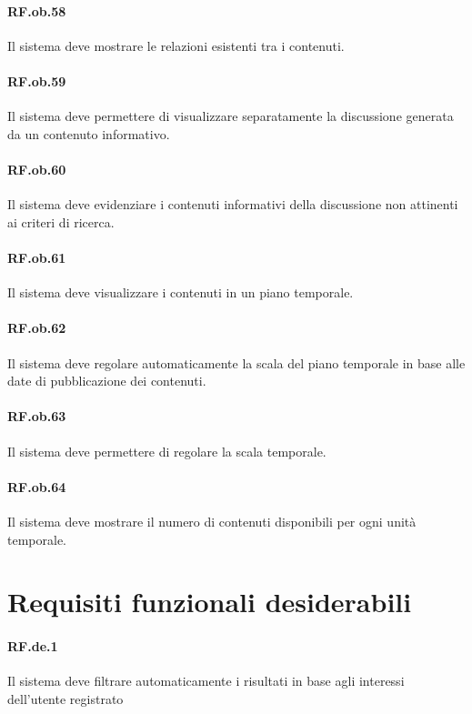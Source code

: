\documentclass[10pt,a4paper,headinclude,footinclude,hidelinks]{scrreprt} %
\begin{document}
	\paragraph{RF.ob.58} Il sistema deve mostrare le relazioni esistenti tra i contenuti.

	\paragraph{RF.ob.59} Il sistema deve permettere di visualizzare separatamente la discussione generata da un contenuto informativo.

	\paragraph{RF.ob.60} Il sistema deve evidenziare i contenuti informativi della discussione non attinenti ai criteri di ricerca.

	\paragraph{RF.ob.61} Il sistema deve visualizzare i contenuti in un piano temporale.

	\paragraph{RF.ob.62} Il sistema deve regolare automaticamente la scala del piano temporale in base alle date di pubblicazione dei contenuti.

	\paragraph{RF.ob.63} Il sistema deve permettere di regolare la scala temporale.

	\paragraph{RF.ob.64} Il sistema deve mostrare il numero di contenuti disponibili per ogni unità temporale.

	\section{Requisiti funzionali desiderabili}
	\label{ch:stage:ar:requisiti:op}

	\paragraph{RF.de.1} Il sistema deve filtrare automaticamente i risultati in base agli interessi dell'utente registrato
\end{document}
